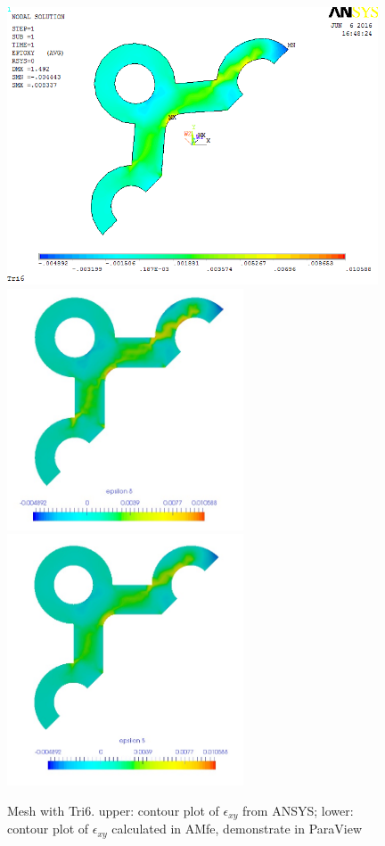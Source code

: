 \begin{figure}[htbp]
	\begin{center}
		\includegraphics[width=11cm,clip]{Tri6_Exy.png} 	
		\includegraphics[width=7cm,clip]{Tri6_Exy_PD.png} 	
		\includegraphics[width=7cm,clip]{Tri6_Exy_P.png} 		
		\caption{Mesh with Tri6. upper: contour plot of $\epsilon_{xy}$ from ANSYS; lower: contour plot of $\epsilon_{xy}$ calculated in AMfe, demonstrate in ParaView} \label{fig: Tri6_Exy}
	\end{center}
\end{figure}
\clearpage 

